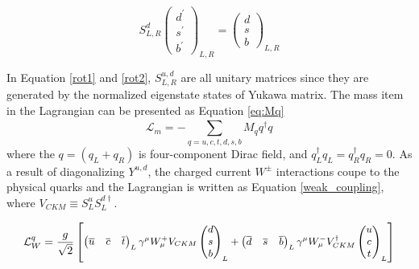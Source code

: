 \begin{equation}\label{rot2}
S_{L,R}^{d}
\begin{pmatrix}
d^\prime   \\
s^\prime  \\
b^\prime 
\end{pmatrix}_{L,R}
= \begin{pmatrix}
d  \\
s  \\
b 
\end{pmatrix}_{L,R}
\end{equation}


 In Equation \ref{rot1} and \ref{rot2}, $S^{u,d}_{L,R}$ are all unitary matrices since they are generated by the normalized eigenstate states of Yukawa matrix. The mass
  item in the Lagrangian can be presented as Equation \ref{eq:Mq}
\begin{equation}\label{eq:Mq}
\mathcal{L}_{m} = -\sum_{q=u,c,t,d,s,b}^{} M_q q^{\dag}_{} q_{}
\end{equation}
where the $q=(q_L+q_R)$ is four-component Dirac field, and $q_L^\dag q_L = q_R^\dag q_R = 0$. 
As a result of diagonalizing $Y^{u,d}$,  the charged current $W^{\pm}$ interactions coupe to the physical quarks and the Lagrangian is written as Equation \ref{weak_coupling}, where $V_{CKM} \equiv S_L^u S_L^{d\dag}$.

\begin{equation}\label{weak_coupling}
\small
\mathcal{L}^q_W = \frac{g}{\sqrt{2}}
\begin{bmatrix}
\begin{pmatrix}
\overline{u}&\overline{c}&\overline{t}
\end{pmatrix}_L

\gamma^\mu W^{+}_{\mu}
V_{CKM}
\begin{pmatrix}
d\\s\\b\\
\end{pmatrix}_L+
\begin{pmatrix}
\overline{d}&\overline{s}&\overline{b}
\end{pmatrix}_L
\gamma^\mu W^{-}_{\mu}
V_{CKM}^{\dag}
\begin{pmatrix}
u\\c\\t\\
\end{pmatrix}_L
\end{bmatrix}
\end{equation}

